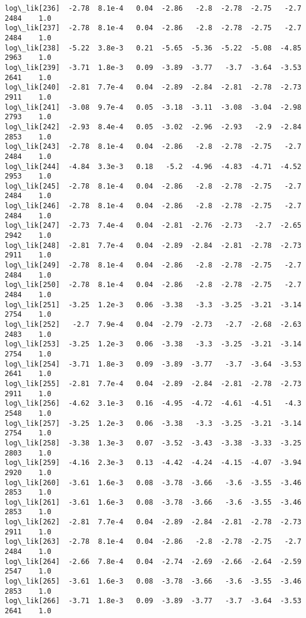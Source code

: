 \documentclass[11pt]{article}
\begin{document}
\begin{Verbatim}[commandchars=\\\{\}]
log\_lik[236]  -2.78  8.1e-4   0.04  -2.86   -2.8  -2.78  -2.75   -2.7   2484    1.0
log\_lik[237]  -2.78  8.1e-4   0.04  -2.86   -2.8  -2.78  -2.75   -2.7   2484    1.0
log\_lik[238]  -5.22  3.8e-3   0.21  -5.65  -5.36  -5.22  -5.08  -4.85   2963    1.0
log\_lik[239]  -3.71  1.8e-3   0.09  -3.89  -3.77   -3.7  -3.64  -3.53   2641    1.0
log\_lik[240]  -2.81  7.7e-4   0.04  -2.89  -2.84  -2.81  -2.78  -2.73   2911    1.0
log\_lik[241]  -3.08  9.7e-4   0.05  -3.18  -3.11  -3.08  -3.04  -2.98   2793    1.0
log\_lik[242]  -2.93  8.4e-4   0.05  -3.02  -2.96  -2.93   -2.9  -2.84   2853    1.0
log\_lik[243]  -2.78  8.1e-4   0.04  -2.86   -2.8  -2.78  -2.75   -2.7   2484    1.0
log\_lik[244]  -4.84  3.3e-3   0.18   -5.2  -4.96  -4.83  -4.71  -4.52   2953    1.0
log\_lik[245]  -2.78  8.1e-4   0.04  -2.86   -2.8  -2.78  -2.75   -2.7   2484    1.0
log\_lik[246]  -2.78  8.1e-4   0.04  -2.86   -2.8  -2.78  -2.75   -2.7   2484    1.0
log\_lik[247]  -2.73  7.4e-4   0.04  -2.81  -2.76  -2.73   -2.7  -2.65   2942    1.0
log\_lik[248]  -2.81  7.7e-4   0.04  -2.89  -2.84  -2.81  -2.78  -2.73   2911    1.0
log\_lik[249]  -2.78  8.1e-4   0.04  -2.86   -2.8  -2.78  -2.75   -2.7   2484    1.0
log\_lik[250]  -2.78  8.1e-4   0.04  -2.86   -2.8  -2.78  -2.75   -2.7   2484    1.0
log\_lik[251]  -3.25  1.2e-3   0.06  -3.38   -3.3  -3.25  -3.21  -3.14   2754    1.0
log\_lik[252]   -2.7  7.9e-4   0.04  -2.79  -2.73   -2.7  -2.68  -2.63   2483    1.0
log\_lik[253]  -3.25  1.2e-3   0.06  -3.38   -3.3  -3.25  -3.21  -3.14   2754    1.0
log\_lik[254]  -3.71  1.8e-3   0.09  -3.89  -3.77   -3.7  -3.64  -3.53   2641    1.0
log\_lik[255]  -2.81  7.7e-4   0.04  -2.89  -2.84  -2.81  -2.78  -2.73   2911    1.0
log\_lik[256]  -4.62  3.1e-3   0.16  -4.95  -4.72  -4.61  -4.51   -4.3   2548    1.0
log\_lik[257]  -3.25  1.2e-3   0.06  -3.38   -3.3  -3.25  -3.21  -3.14   2754    1.0
log\_lik[258]  -3.38  1.3e-3   0.07  -3.52  -3.43  -3.38  -3.33  -3.25   2803    1.0
log\_lik[259]  -4.16  2.3e-3   0.13  -4.42  -4.24  -4.15  -4.07  -3.94   2920    1.0
log\_lik[260]  -3.61  1.6e-3   0.08  -3.78  -3.66   -3.6  -3.55  -3.46   2853    1.0
log\_lik[261]  -3.61  1.6e-3   0.08  -3.78  -3.66   -3.6  -3.55  -3.46   2853    1.0
log\_lik[262]  -2.81  7.7e-4   0.04  -2.89  -2.84  -2.81  -2.78  -2.73   2911    1.0
log\_lik[263]  -2.78  8.1e-4   0.04  -2.86   -2.8  -2.78  -2.75   -2.7   2484    1.0
log\_lik[264]  -2.66  7.8e-4   0.04  -2.74  -2.69  -2.66  -2.64  -2.59   2547    1.0
log\_lik[265]  -3.61  1.6e-3   0.08  -3.78  -3.66   -3.6  -3.55  -3.46   2853    1.0
log\_lik[266]  -3.71  1.8e-3   0.09  -3.89  -3.77   -3.7  -3.64  -3.53   2641    1.0

\end{Verbatim}
\end{document}
